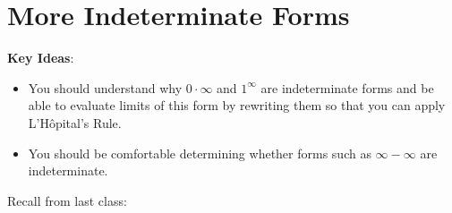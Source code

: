 \documentclass[main]{subfiles}
\begin{document}
\ifSubfilesClassLoaded{%
  \chaptermark{\chapterfour}
}{}

\section{More Indeterminate Forms} \label{ws4-3}

\begin{problemonly}
    \begin{framed}

\textbf{Key Ideas}:

\begin{itemize}[topsep=0pt,partopsep=0pt,parsep=8pt,itemsep=0pt]

\item You should understand why $0 \cdot \infty$ and $1^\infty$ are
  indeterminate forms and be able to evaluate limits of this form by
  rewriting them so that you can apply L'H\^opital's Rule.

\item You should be comfortable determining whether forms such as $\infty
  - \infty$ are indeterminate.

\end{itemize}
\end{framed}
\end{problemonly}

Recall from last class:
\end{document}
